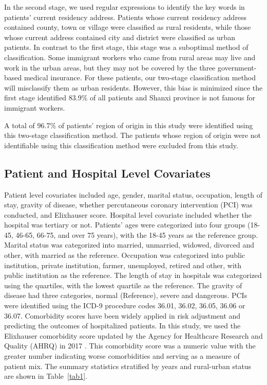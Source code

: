 \documentclass[ijerph,article,submit,moreauthors,pdftex,10pt,a4paper]{mdpi}
\theoremstyle{mdpi}
\newcounter{ex}
\newcounter{re}
\theoremstyle{mdpidefinition}
\begin{document}
In the second stage, we used regular expressions to identify the key words in patients' current residency address. Patients whose current residency address contained county, town or village were classified as rural residents, while those whose current address contained city and district were classified as urban patients. In contrast to the first stage, this stage was a suboptimal method of classification. Some immigrant workers who came from rural areas may live and work in the urban areas, but they may not be covered by the three government-based medical insurance. For these patients, our two-stage classification method will misclassify them as urban residents. However, this bias is minimized since the first stage identified 83.9\% of all patients and Shanxi province is not famous for immigrant workers.

A total of 96.7\% of patients' region of origin in this study were identified using this two-stage classification method. The patients whose region of origin were not identifiable using this classification method were excluded from this study.


\subsection{Patient and Hospital Level Covariates}
Patient level covariates included age, gender, marital status, occupation, length of stay, gravity of disease, whether percutaneous coronary intervention (PCI) was conducted, and Elixhauser score. Hospital level covariate included whether the hospital was tertiary or not. Patients' ages were categorized into four groups (18-45, 46-65, 66-75, and over 75 years), with the 18-45 years as the reference group. Marital status was categorized into married, unmarried, widowed, divorced and other, with married as the reference. Occupation was categorized into public institution, private institution, farmer, unemployed, retired and other, with public institution as the reference. The length of stay in hospitals was categorized using the quartiles, with the lowest quartile as the reference. The gravity of disease had three categories, normal (Reference), severe and dangerous. PCIs were identified using the ICD-9 procedure codes 36.01, 36.02, 36.05, 36.06 or 36.07. Comorbidity scores have been widely applied in risk adjustment and predicting the outcomes of hospitalized patients. In this study, we used the Elixhauser comorbidity score updated by the Agency for Healthcare Research and Quality (AHRQ) in 2017 \cite{moore2017identifying}. This comorbidity score was a numeric value with the greater number indicating worse comorbidities and serving as a measure of patient mix. The summary statistics stratified by years and rural-urban status are shown in Table~\ref{tab1}.
\end{document}
